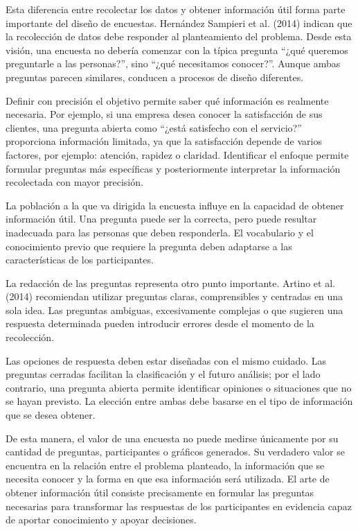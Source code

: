 \documentclass[12pt,letterpaper]{article}
\begin{document}
Esta diferencia entre recolectar los datos y obtener información útil forma parte importante del diseño de encuestas. Hernández Sampieri et al. (2014) indican que la recolección de datos debe responder al planteamiento del problema. Desde esta visión, una encuesta no debería comenzar con la típica pregunta ``¿qué queremos preguntarle a las personas?'', sino ``¿qué necesitamos conocer?''. Aunque ambas preguntas parecen similares, conducen a procesos de diseño diferentes.

Definir con precisión el objetivo permite saber qué información es realmente necesaria. Por ejemplo, si una empresa desea conocer la satisfacción de sus clientes, una pregunta abierta como ``¿está satisfecho con el servicio?'' proporciona información limitada, ya que la satisfacción depende de varios factores, por ejemplo: atención, rapidez o claridad. Identificar el enfoque permite formular preguntas más específicas y posteriormente interpretar la información recolectada con mayor precisión.

La población a la que va dirigida la encuesta influye en la capacidad de obtener información útil. Una pregunta puede ser la correcta, pero puede resultar inadecuada para las personas que deben responderla. El vocabulario y el conocimiento previo que requiere la pregunta deben adaptarse a las características de los participantes.

La redacción de las preguntas representa otro punto importante. Artino et al. (2014) recomiendan utilizar preguntas claras, comprensibles y centradas en una sola idea. Las preguntas ambiguas, excesivamente complejas o que sugieren una respuesta determinada pueden introducir errores desde el momento de la recolección.

Las opciones de respuesta deben estar diseñadas con el mismo cuidado. Las preguntas cerradas facilitan la clasificación y el futuro análisis; por el lado contrario, una pregunta abierta permite identificar opiniones o situaciones que no se hayan previsto. La elección entre ambas debe basarse en el tipo de información que se desea obtener.

De esta manera, el valor de una encuesta no puede medirse únicamente por su cantidad de preguntas, participantes o gráficos generados. Su verdadero valor se encuentra en la relación entre el problema planteado, la información que se necesita conocer y la forma en que esa información será utilizada. El arte de obtener información útil consiste precisamente en formular las preguntas necesarias para transformar las respuestas de los participantes en evidencia capaz de aportar conocimiento y apoyar decisiones.
\end{document}
